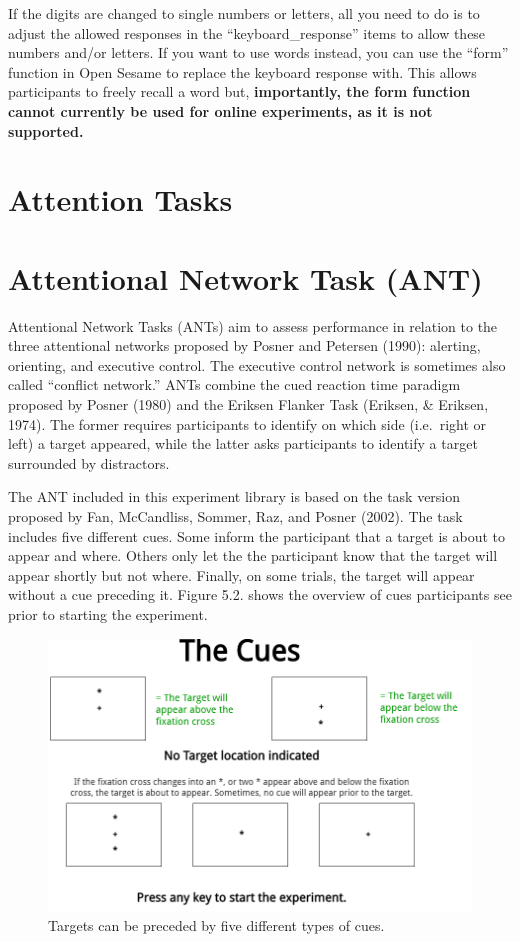 \documentclass[
]{book}
\begin{document}
If the digits are changed to single numbers or letters, all you need to do is to adjust the allowed responses in the ``keyboard\_response'' items to allow these numbers and/or letters. If you want to use words instead, you can use the ``form'' function in Open Sesame to replace the keyboard response with. This allows participants to freely recall a word but, \textbf{importantly, the form function cannot currently be used for online experiments, as it is not supported.}

\hypertarget{attention-tasks}{%
\section{Attention Tasks}\label{attention-tasks}}

\hypertarget{attentional-network-task-ant}{%
\section{Attentional Network Task (ANT)}\label{attentional-network-task-ant}}

Attentional Network Tasks (ANTs) aim to assess performance in relation to the three attentional networks proposed by Posner and Petersen (1990): alerting, orienting, and executive control. The executive control network is sometimes also called ``conflict network.'' ANTs combine the cued reaction time paradigm proposed by Posner (1980) and the Eriksen Flanker Task (Eriksen, \& Eriksen, 1974). The former requires participants to identify on which side (i.e.~right or left) a target appeared, while the latter asks participants to identify a target surrounded by distractors.

The ANT included in this experiment library is based on the task version proposed by Fan, McCandliss, Sommer, Raz, and Posner (2002). The task includes five different cues. Some inform the participant that a target is about to appear and where. Others only let the the participant know that the target will appear shortly but not where. Finally, on some trials, the target will appear without a cue preceding it. Figure 5.2. shows the overview of cues participants see prior to starting the experiment.

\begin{figure}

{\centering \includegraphics[width=0.8\linewidth]{images/ANT_Cues} 

}

\caption{Targets can be preceded by five different types of cues.}\label{fig:Figure2-2}
\end{figure}
\end{document}
